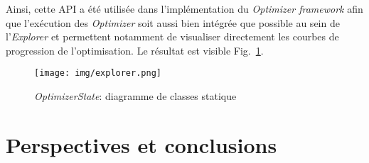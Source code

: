\documentclass[a4paper, 11pt]{report}
\begin{document}
Ainsi, cette API a été utilisée dans l'implémentation du \textit{Optimizer framework} afin que l'exécution des \textit{Optimizer} soit aussi bien intégrée que possible au sein de l'\textit{Explorer} et permettent notamment de visualiser directement les courbes de progression de l'optimisation. Le résultat est visible Fig.~\ref{explorer}.

\begin{figure}[!h]
\centering
\texttt{[image: img/explorer.png]}
\caption{\textit{OptimizerState}: diagramme de classes statique}
\label{explorer}
\end{figure}


\chapter{Perspectives et conclusions}




\newpage
\nocite{*}


\end{document}
